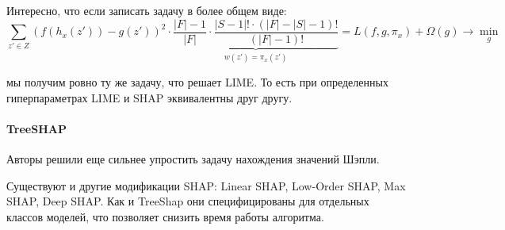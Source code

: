 Интересно, что если записать задачу в более общем виде:
\[
\sum\limits_{z' \in Z} (f(h_x(z')) - g(z'))^2 \cdot \underbrace{\frac{|F|-1}{|F|} \cdot \frac{|S - 1|! \cdot (|F|-|S|-1)!}{(|F|-1)!}}_{w(z') = \pi_x(z')} = L(f, g, \pi_x) + \Omega(g) \rightarrow \min_g
\]

мы получим ровно ту же задачу, что решает LIME. То есть при определенных гиперпараметрах LIME и SHAP эквивалентны друг другу.

\paragraph{TreeSHAP}
Авторы решили еще сильнее упростить задачу нахождения значений Шэпли. %

Существуют и другие модификации SHAP: Linear SHAP, Low-Order SHAP, Max SHAP, Deep SHAP. Как и TreeShap они специфицированы для отдельных классов моделей, что позволяет снизить время работы алгоритма.


